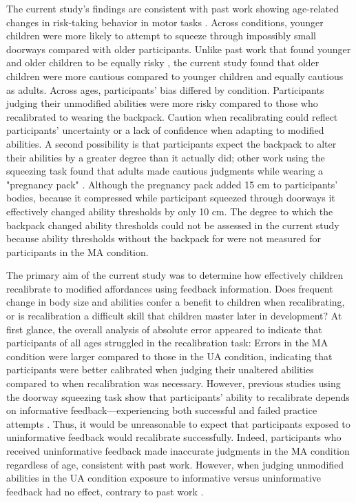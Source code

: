 \documentclass[a4paper,man,natbib,floatsintext,noextraspace]{apa6}
\begin{document}
The current study's findings are consistent with past work showing age-related changes in risk-taking behavior in motor tasks \citep{Plumert95,DekkerNardini,Plumert97}. Across conditions, younger children were more likely to attempt to squeeze through impossibly small doorways compared with older participants. Unlike past work that found younger and older children to be equally risky \citep{DekkerNardini}, the current study found that older children were more cautious compared to younger children and equally cautious as adults. Across ages, participants' bias differed by condition. Participants judging their unmodified abilities were more risky compared to those who recalibrated to wearing the backpack. Caution when recalibrating could reflect participants' uncertainty or a lack of confidence when adapting to modified abilities. A second possibility is that participants expect the backpack to alter their abilities by a greater degree than it actually did; other work using the squeezing task found that adults made cautious judgments while wearing a "pregnancy pack" \citep{PregAps}. Although the pregnancy pack added 15 cm to participants' bodies, because it compressed while participant squeezed through doorways it effectively changed ability thresholds by only 10 cm. The degree to which the backpack changed ability thresholds could not be assessed in the current study because ability thresholds without the backpack for were not measured for participants in the MA condition.

The primary aim of the current study was to determine how effectively children recalibrate to modified affordances using feedback information. Does frequent change in body size and abilities confer a benefit to children when recalibrating, or is recalibration a difficult skill that children master later in development? At first glance, the overall analysis of absolute error appeared to indicate that participants of all ages struggled in the recalibration task: Errors in the MA condition were larger compared to those in the UA condition, indicating that participants were better calibrated when judging their unaltered abilities compared to when recalibration was necessary. However, previous studies using the doorway squeezing task show that participants' ability to recalibrate depends on informative feedback---experiencing both successful and failed practice attempts \citep{DoorwayExplore, Recal}. Thus, it would be unreasonable to expect that participants exposed to uninformative feedback would recalibrate successfully. Indeed, participants who received uninformative feedback made inaccurate judgments in the MA condition regardless of age, consistent with past work. However, when judging unmodified abilities in the UA condition exposure to informative versus uninformative feedback had no effect, contrary to past work \citep{Dina}.
\end{document}
